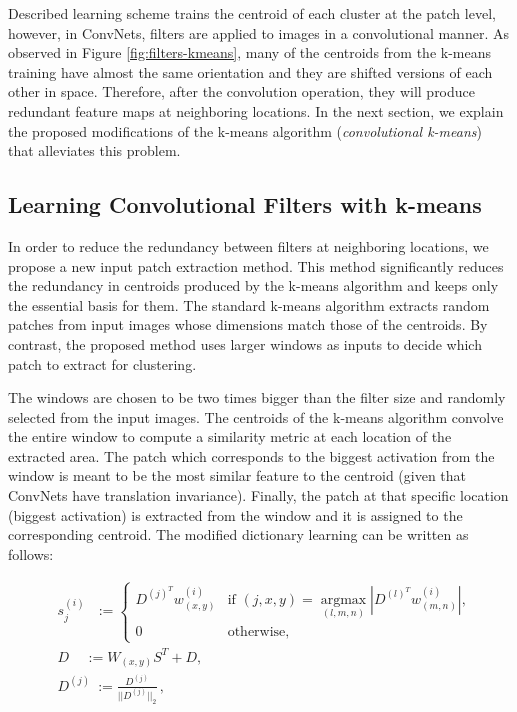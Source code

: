 \documentclass{article} \usepackage{iclr2016_workshop,times}
\DeclareMathOperator*{\argmax}{argmax}
\newcommand*{\argmaxl}{\argmax\limits}
\begin{document}
Described learning scheme trains the centroid of each cluster at the patch level, however, in ConvNets, filters are applied to images in a convolutional manner.
As observed in Figure \ref{fig:filters-kmeans}, many of the centroids from the k-means training have almost the same orientation and they are shifted  versions of each other in space. Therefore, after the convolution operation, they will produce redundant feature maps at neighboring locations.
In the next section, we explain the proposed modifications of the k-means algorithm (\textit{convolutional k-means}) that alleviates this problem.





\subsection{Learning Convolutional Filters with k-means}

In order to reduce the redundancy between filters at neighboring locations, we propose a new input patch extraction method. This method significantly reduces the redundancy in centroids produced by the k-means algorithm and keeps only the essential basis for them.
The standard k-means algorithm extracts random patches from input images whose dimensions match those of the centroids.
By contrast, the proposed method uses larger windows as inputs to decide which patch to extract for clustering.

The windows are chosen to be two times bigger than the filter size and randomly selected from the input images. The centroids of the k-means algorithm convolve the entire window to compute a similarity metric at each location of the extracted area.
The patch which corresponds to the biggest activation from the window is meant to be the most similar feature to the centroid (given that ConvNets have translation invariance).
Finally, the patch at that specific location (biggest activation) is extracted from the window and it is assigned to the corresponding centroid. The modified dictionary learning can be written as follows:

\begin{equation}
\begin{aligned}
 & s_j^{(i)} \ \ \ :=
  \begin{cases}
   D^{(j)^T}w^{(i)}_{(x, y)} & \text{if } (j, x, y) = \argmaxl_{(l, m, n)} \left|D^{(l)^T}w^{(i)}_{(m, n)}\right|, \\
   0      & \text{otherwise,}
  \end{cases}\\
  & {D\ \ \ \ \ := W_{(x,y)}S^T+D},\\
  & {D^{(j)} \ := \frac{D^{(j)}}{||D^{(j)}||_2}}\, ,
 \end{aligned}
  \label{eq:kmeans-conv}
\end{equation}
\end{document}
